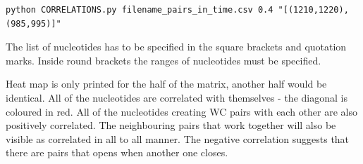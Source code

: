 \documentclass[12pt]{article}
\begin{document}
\begin{verbatim}
python CORRELATIONS.py filename_pairs_in_time.csv 0.4 "[(1210,1220),(985,995)]" 
\end{verbatim}

The list of nucleotides has to be specified in the square brackets and quotation marks. Inside round brackets the ranges of nucleotides must be specified. 

Heat map is only printed for the half of the matrix, another half would be identical. All of the nucleotides are correlated with themselves - the diagonal is coloured in red. All of the nucleotides creating WC pairs with each other are also positively correlated. The neighbouring pairs that work together will also be visible as correlated in all to all manner. The negative correlation suggests that there are pairs that opens when another one closes.
\end{document}
